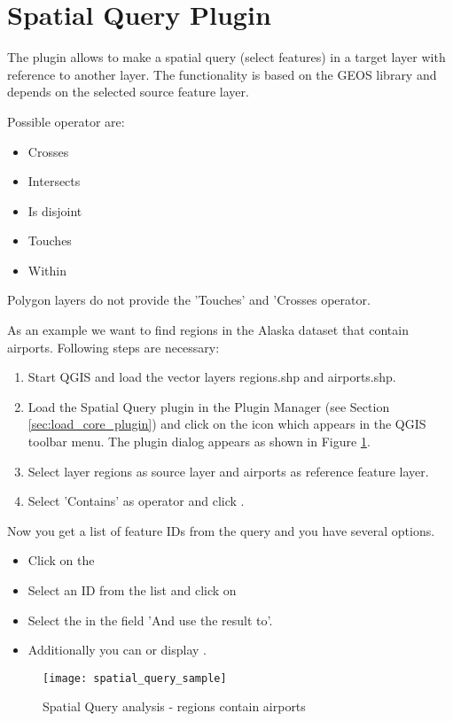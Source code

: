 
\section{Spatial Query Plugin}\label{sec:spatial_query}

\updatedisclaimer

The  plugin allows to make a spatial 
query (select features) in a target layer with reference to another layer. The 
functionality is based on the GEOS library and depends on the selected source 
feature layer. 

Possible operator are:

\begin{itemize}[label=--]
\item Crosses
\item Intersects
\item Is disjoint
\item Touches
\item Within
\end{itemize}

Polygon layers do not provide the 'Touches' and 'Crosses operator.


As an example we want to find regions in the Alaska dataset that contain 
airports. Following steps are necessary:

\begin{enumerate}
  \item Start QGIS and load the vector layers regions.shp and airports.shp. 
  \item Load the Spatial Query plugin in the Plugin Manager (see Section 
  \ref{sec:load_core_plugin}) and click on the     
  icon which appears in the QGIS toolbar menu. The plugin dialog appears as shown 
  in Figure \ref{fig:spatialquerysample}.
  \item Select layer regions as source layer and airports as reference feature layer.
  \item Select 'Contains' as operator and click .
\end{enumerate}

Now you get a list of feature IDs from the query and you have several options.

\begin{itemize}[label=--]
\item Click on the 
\item Select an ID from the list and click on 
\item Select the  in the field 'And use the 
result to'.
\item Additionally you can  or display .
\end{itemize}

\begin{figure}[ht]
   \centering
   \texttt{[image: spatial\_query\_sample]}
   \caption{Spatial Query analysis - regions contain airports \nixcaption}
   \label{fig:spatialquerysample}
\end{figure}

\FloatBarrier

